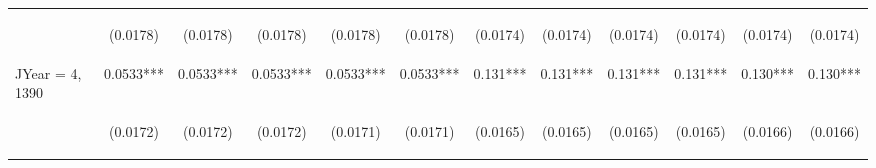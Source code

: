 \documentclass[]{article}
\begin{document}
\begin{center}
\begin{tabular}{lccccccccccc}
\vspace{4pt} & \begin{footnotesize}(0.0178)\end{footnotesize} & \begin{footnotesize}(0.0178)\end{footnotesize} & \begin{footnotesize}(0.0178)\end{footnotesize} & \begin{footnotesize}(0.0178)\end{footnotesize} & \begin{footnotesize}(0.0178)\end{footnotesize} & \begin{footnotesize}(0.0174)\end{footnotesize} & \begin{footnotesize}(0.0174)\end{footnotesize} & \begin{footnotesize}(0.0174)\end{footnotesize} & \begin{footnotesize}(0.0174)\end{footnotesize} & \begin{footnotesize}(0.0174)\end{footnotesize} & \begin{footnotesize}(0.0174)\end{footnotesize} \\
JYear = 4, 1390 & 0.0533*** & 0.0533*** & 0.0533*** & 0.0533*** & 0.0533*** & 0.131*** & 0.131*** & 0.131*** & 0.131*** & 0.130*** & 0.130*** \\
\vspace{4pt} & \begin{footnotesize}(0.0172)\end{footnotesize} & \begin{footnotesize}(0.0172)\end{footnotesize} & \begin{footnotesize}(0.0172)\end{footnotesize} & \begin{footnotesize}(0.0171)\end{footnotesize} & \begin{footnotesize}(0.0171)\end{footnotesize} & \begin{footnotesize}(0.0165)\end{footnotesize} & \begin{footnotesize}(0.0165)\end{footnotesize} & \begin{footnotesize}(0.0165)\end{footnotesize} & \begin{footnotesize}(0.0165)\end{footnotesize} & \begin{footnotesize}(0.0166)\end{footnotesize} & \begin{footnotesize}(0.0166)\end{footnotesize} \\

\end{tabular}
\end{center}
\end{document}
